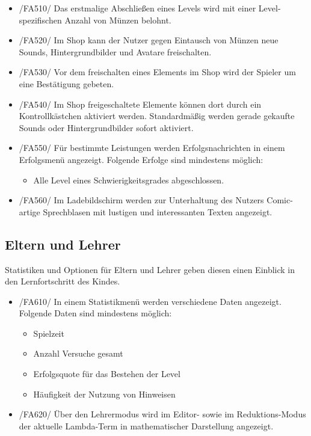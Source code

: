 \begin{itemize}
\item /FA510/ Das erstmalige Abschließen eines Levels wird mit einer Level-spezifischen Anzahl von Münzen belohnt.
\item /FA520/ Im Shop kann der Nutzer gegen Eintausch von Münzen neue Sounds, Hintergrundbilder und Avatare freischalten.
\item /FA530/ Vor dem freischalten eines Elements im Shop wird der Spieler um eine Bestätigung gebeten.
\item /FA540/ Im Shop freigeschaltete Elemente können dort durch ein Kontrollkästchen aktiviert werden. Standardmäßig werden gerade gekaufte Sounds oder Hintergrundbilder sofort aktiviert.
\item /FA550/ Für bestimmte Leistungen werden Erfolgsnachrichten in einem Erfolgsmenü angezeigt. Folgende Erfolge sind mindestens möglich:
\begin{itemize}
\item Alle Level eines Schwierigkeitsgrades abgeschlossen.
\end{itemize}
\item /FA560/ Im Ladebildschirm werden zur Unterhaltung des Nutzers Comic-artige Sprechblasen mit lustigen und interessanten Texten angezeigt.
\end{itemize}

\subsection{Eltern und Lehrer}

Statistiken und Optionen für Eltern und Lehrer geben diesen einen Einblick in den Lernfortschritt des Kindes.

\begin{itemize}
\item /FA610/ In einem Statistikmenü werden verschiedene Daten angezeigt. Folgende Daten sind mindestens möglich:
\begin{itemize}
\item Spielzeit
\item Anzahl Versuche gesamt
\item Erfolgsquote für das Bestehen der Level
\item Häufigkeit der Nutzung von Hinweisen
\end{itemize}
\item /FA620/ Über den Lehrermodus wird im Editor- sowie im Reduktions-Modus der aktuelle Lambda-Term in mathematischer Darstellung angezeigt.
\end{itemize}

